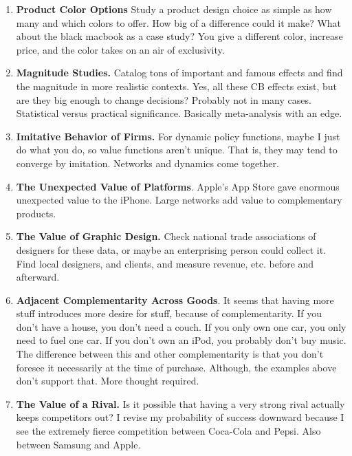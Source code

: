 \documentclass[paper=a4, fontsize=11pt]{scrartcl} %
\numberwithin{equation}{section} %
\numberwithin{figure}{section} %
\numberwithin{table}{section} %
\begin{document}
\begin{enumerate}

\item \textbf{Product Color Options} Study a product design choice as simple as how many and which colors to offer.  How big of a difference could it make?  What about the black macbook as a case study?  You give a different color, increase price, and the color takes on an air of exclusivity.  

\item \textbf{Magnitude Studies.}  Catalog tons of important and famous effects and find the magnitude in more realistic contexts.  Yes, all these CB effects exist, but are they big enough to change decisions?  Probably not in many cases. Statistical versus practical significance.   Basically meta-analysis with an edge.

\item \textbf{Imitative Behavior of Firms.}  For dynamic policy functions, maybe I just do what you do, so value functions aren't unique.  That is, they may tend to converge by imitation.  Networks and dynamics come together.  

\item \textbf{The Unexpected Value of Platforms}.  Apple's App Store gave enormous unexpected value to the iPhone.  Large networks add value to complementary products.

\item \textbf{The Value of Graphic Design.}  Check national trade associations of designers for these data, or maybe an enterprising person could collect it.  Find local designers, and clients, and measure revenue, etc. before and afterward.  

\item \textbf{Adjacent Complementarity Across Goods}.  It seems that having more stuff introduces more desire for stuff, because of complementarity.  If you don't have a house, you don't need a couch.  If you only own one car, you only need to fuel one car.  If you don't own an iPod, you probably don't buy music.  The difference between this and other complementarity is that you don't foresee it necessarily at the time of purchase.  Although, the examples above don't support that.  More thought required.

\item \textbf{The Value of a Rival.}  Is it possible that having a very strong rival actually keeps competitors out?  I revise my probability of success downward because I see the extremely fierce competition between Coca-Cola and Pepsi.  Also between Samsung and Apple.  


\end{enumerate}
\end{document}
